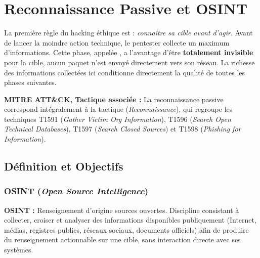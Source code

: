 

\chapter{Reconnaissance Passive et OSINT}
\label{chap:osint}

La première règle du hacking éthique est : \textit{connaître sa cible avant d'agir}.
Avant de lancer la moindre action technique, le pentester collecte un maximum
d'informations. Cette phase, appelée , a
l'avantage d'être \textbf{totalement invisible} pour la cible, aucun paquet
n'est envoyé directement vers son réseau. La richesse des informations collectées
ici conditionne directement la qualité de toutes les phases suivantes.

\begin{boxinfo}
\textbf{MITRE ATT\&CK, Tactique associée :}
La reconnaissance passive correspond intégralement à la tactique
 (\textit{Reconnaissance}), qui regroupe les techniques
T1591 (\textit{Gather Victim Org Information}), T1596
(\textit{Search Open Technical Databases}), T1597
(\textit{Search Closed Sources}) et T1598
(\textit{Phishing for Information}).
\end{boxinfo}

\section{Définition et Objectifs}
\label{sec:osint_def}

\subsection{OSINT (\textit{Open Source Intelligence})}

\begin{boxdef}
\textbf{OSINT :} Renseignement d'origine sources ouvertes. Discipline consistant
à collecter, croiser et analyser des informations disponibles publiquement
(Internet, médias, registres publics, réseaux sociaux, documents officiels) afin
de produire du renseignement actionnable sur une cible, sans interaction directe
avec ses systèmes.
\end{boxdef}

